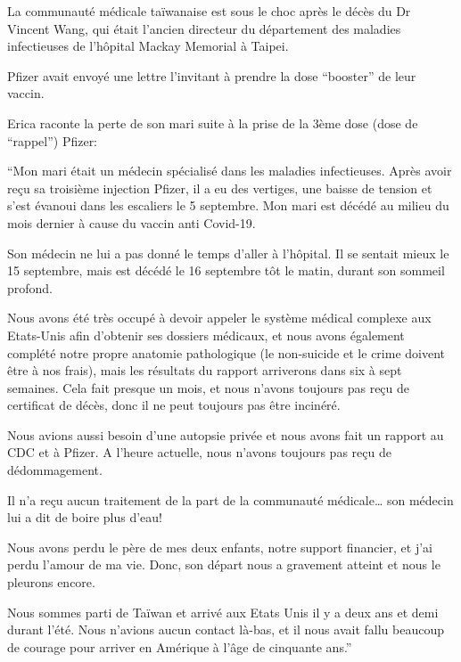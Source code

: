 La communauté médicale taïwanaise est sous le choc après le décès du Dr Vincent
Wang, qui était l'ancien directeur du département des maladies infectieuses de
l'hôpital Mackay Memorial à Taipei.

Pfizer avait envoyé une lettre l'invitant à prendre la dose “booster” de leur
vaccin.

Erica raconte la perte de son mari suite à la prise de la 3ème dose (dose de
“rappel”) Pfizer:

“Mon mari était un médecin spécialisé dans les maladies infectieuses. Après
avoir reçu sa troisième injection Pfizer, il a eu des vertiges, une baisse de
tension et s'est évanoui dans les escaliers le 5 septembre. Mon mari est décédé
au milieu du mois dernier à cause du vaccin anti Covid-19.

Son médecin ne lui a pas donné le temps d'aller à l'hôpital. Il se sentait mieux
le 15 septembre, mais est décédé le 16 septembre tôt le matin, durant son
sommeil profond.

Nous avons été très occupé à devoir appeler le système médical complexe aux
Etats-Unis afin d'obtenir ses dossiers médicaux, et nous avons également
complété notre propre anatomie pathologique (le non-suicide et le crime doivent
être à nos frais), mais les résultats du rapport arriverons dans six à sept
semaines. Cela fait presque un mois, et nous n'avons toujours pas reçu de
certificat de décès, donc il ne peut toujours pas être incinéré.

Nous avions aussi besoin d'une autopsie privée et nous avons fait un rapport au
CDC et à Pfizer. A l'heure actuelle, nous n'avons toujours pas reçu de
dédommagement.

Il n'a reçu aucun traitement de la part de la communauté médicale… son médecin
lui a dit de boire plus d'eau!

Nous avons perdu le père de mes deux enfants, notre support financier, et j'ai
perdu l'amour de ma vie. Donc, son départ nous a gravement atteint et nous le
pleurons encore.

Nous sommes parti de Taïwan et arrivé aux Etats Unis il y a deux ans et demi
durant l'été. Nous n'avions aucun contact là-bas, et il nous avait fallu
beaucoup de courage pour arriver en Amérique à l'âge de cinquante ans.”

